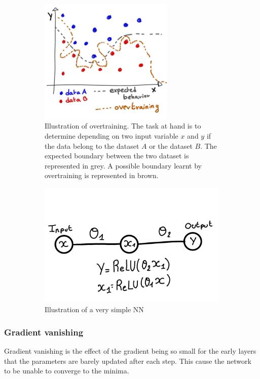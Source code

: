 \documentclass[../main.tex]{subfiles}
\begin{document}
\begin{figure}
  \centering
  \begin{subfigure}[t]{0.48\linewidth}
    \centering
    \includegraphics[height=6cm]{images/ml/overtraining.jpg}
    \caption{Illustration of overtraining. The task at hand is to determine depending on two input variable $x$ and $y$ if the data belong to the dataset $A$ or the dataset $B$. The expected boundary between the two dataset is represented in grey. A possible boundary learnt by overtraining is represented in brown.}
    \label{fig:ml:overtraining}
  \end{subfigure}
  \hfill
  \begin{subfigure}[t]{0.48\linewidth}
    \centering
    \includegraphics[height=6cm]{images/ml/vanishing_illus.jpg}
    \caption{Illustration of a very simple NN}
    \label{fig:ml:vanishing}
  \end{subfigure}
  \caption{}
\end{figure}

\subsubsection{Gradient vanishing}
Gradient vanishing is the effect of the gradient being so small for the early layers that the parameters are barely updated after each step. This cause the network to be unable to converge to the minima.
\end{document}
